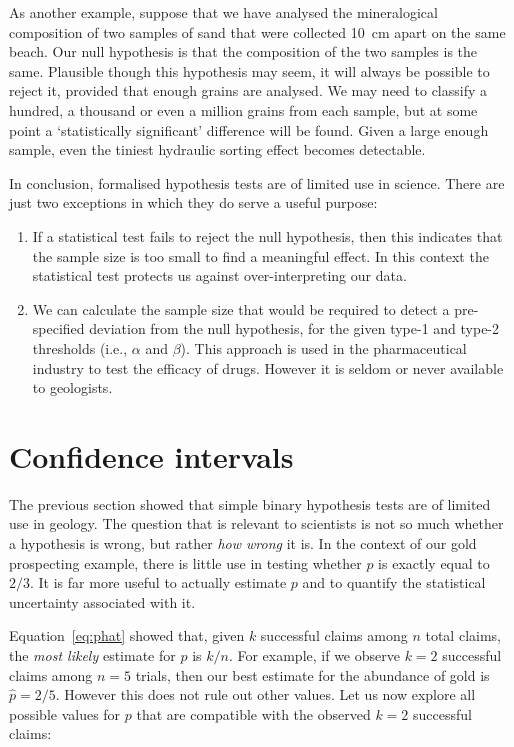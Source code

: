 As another example, suppose that we have analysed the mineralogical
composition of two samples of sand that were collected 10~cm apart on
the same beach. Our null hypothesis is that the composition of the two
samples is the same. Plausible though this hypothesis may seem, it
will always be possible to reject it, provided that enough grains are
analysed. We may need to classify a hundred, a thousand or even a
million grains from each sample, but at some point a `statistically
significant' difference will be found. Given a large enough sample,
even the tiniest hydraulic sorting effect becomes detectable.\medskip

In conclusion, formalised hypothesis tests are of limited use in
science.  There are just two exceptions in which they do serve a
useful purpose:

\begin{enumerate}
\item If a statistical test fails to reject the null hypothesis, then
  this indicates that the sample size is too small to find a
  meaningful effect. In this context the statistical test protects us
  against over-interpreting our data.
\item We can calculate the sample size that would be required to
  detect a pre-specified deviation from the null hypothesis, for the
  given type-1 and type-2 thresholds (i.e., $\alpha$ and $\beta$).
  This approach is used in the pharmaceutical industry to test the
  efficacy of drugs. However it is seldom or never available to
  geologists.
\end{enumerate}

\section{Confidence intervals}
\label{sec:binomCI}

The previous section showed that simple binary hypothesis tests are of
limited use in geology. The question that is relevant to scientists is
not so much whether a hypothesis is wrong, but rather \emph{how wrong}
it is. In the context of our gold prospecting example, there is little
use in testing whether $p$ is exactly equal to $2/3$. It is far more
useful to actually estimate $p$ and to quantify the statistical
uncertainty associated with it.\medskip

Equation~\ref{eq:phat} showed that, given $k$ successful claims among
$n$ total claims, the \emph{most likely} estimate for $p$ is $k/n$.
For example, if we observe $k=2$ successful claims among $n=5$ trials,
then our best estimate for the abundance of gold is $\hat{p}=2/5$.
However this does not rule out other values. Let us now explore all
possible values for $p$ that are compatible with the observed $k=2$
successful claims:


